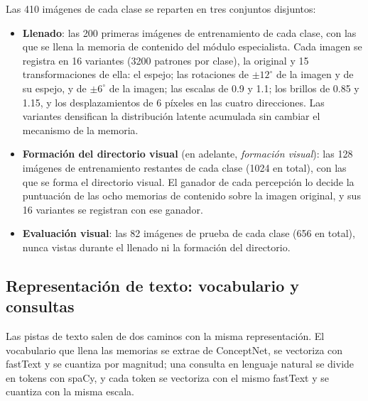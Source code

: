 Las 410 imágenes de cada clase se reparten en tres conjuntos disjuntos:
\begin{itemize}
    \item \textbf{Llenado}: las 200 primeras imágenes de entrenamiento de cada clase, con
    las que se llena la memoria de contenido del módulo especialista.
    Cada imagen se registra en 16 variantes (3200 patrones por clase), la original y 15
    transformaciones de ella: el espejo; las rotaciones de $\pm 12^{\circ}$ de la imagen y
    de su espejo, y de $\pm 6^{\circ}$ de la imagen; las escalas de 0.9 y 1.1; los brillos
    de 0.85 y 1.15, y los desplazamientos de 6 píxeles en las cuatro direcciones.
    Las variantes densifican la distribución latente acumulada sin cambiar el mecanismo
    de la memoria.
    \item \textbf{Formación del directorio visual} (en adelante, \emph{formación visual}):
    las 128 imágenes de entrenamiento restantes de cada clase (1024 en total), con las que
    se forma el directorio visual.
    El ganador de cada percepción lo decide la puntuación de las ocho memorias de
    contenido sobre la imagen original, y sus 16 variantes se registran con ese ganador.
    \item \textbf{Evaluación visual}: las 82 imágenes de prueba de cada clase (656 en
    total), nunca vistas durante el llenado ni la formación del directorio.
\end{itemize}

\subsection{Representación de texto: vocabulario y consultas}
\label{sec:pipeline-semantico}

Las pistas de texto salen de dos caminos con la misma representación.
El vocabulario que llena las memorias se extrae de ConceptNet, se vectoriza con
fastText y se cuantiza por magnitud; una consulta en lenguaje natural se divide en
tokens con spaCy, y cada token se vectoriza con el mismo fastText y se cuantiza con la
misma escala.

